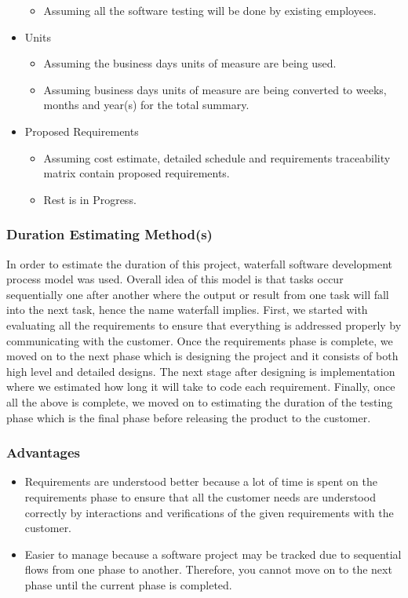 \documentclass{article}
\begin{document}
\begin{itemize}
\begin{itemize}
  \item Assuming all the software testing will be done by existing employees.
  \end{itemize}
\item Units
  \begin{itemize}
  \item Assuming the business days units of measure are being used.
  \item Assuming business days units of measure are being converted to weeks, months and year(s) for the total summary.
  \end{itemize}
\item Proposed Requirements
  \begin{itemize}
  \item Assuming cost estimate, detailed schedule and requirements traceability matrix contain proposed requirements.
  \item Rest is in Progress.
  \end{itemize}
\end{itemize}

\subsubsection{Duration Estimating Method(s)}
\par In order to estimate the duration of this project, waterfall
software development process model was used. Overall idea of this
model is that tasks occur sequentially one after another where the
output or result from one task will fall into the next task, hence the
name waterfall implies. First, we started with evaluating all the
requirements to ensure that everything is addressed properly by
communicating with the customer. Once the requirements phase is
complete, we moved on to the next phase which is designing the project
and it consists of both high level and detailed designs. The next
stage after designing is implementation where we estimated how long it
will take to code each requirement. Finally, once all the above is
complete, we moved on to estimating the duration of the testing phase
which is the final phase before releasing the product to the customer.

\subsubsection{Advantages}
\begin{itemize}
\item Requirements are understood better because a lot of time is spent on the requirements phase to ensure that all the customer needs are understood correctly by interactions and verifications of the given requirements with the customer. 
\item Easier to manage because a software project may be tracked due to sequential flows from one phase to another. Therefore, you cannot move on to the next phase until the current phase is completed.
\end{itemize}
\end{document}
